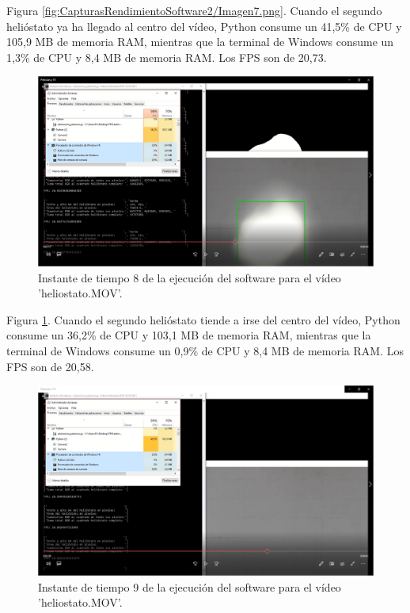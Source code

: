 Figura \ref{fig:CapturasRendimientoSoftware2/Imagen7.png}. Cuando el segundo helióstato ya ha llegado al centro del vídeo, Python consume un 41,5\% de CPU y 105,9 MB de memoria RAM, mientras que la terminal de Windows consume un 1,3\% de CPU y 8,4 MB de memoria RAM. Los FPS son de 20,73.\\[20pt]

\begin{figure}[h!]
  	\centering
	\includegraphics[width=\textwidth]{CapturasRendimientoSoftware2/Imagen8.png}
	\caption{Instante de tiempo 8 de la ejecución del software para el vídeo 'heliostato.MOV'.
	\label{fig:CapturasRendimientoSoftware2/Imagen8.png}}
\end{figure}

Figura \ref{fig:CapturasRendimientoSoftware2/Imagen8.png}. Cuando el segundo helióstato tiende a irse del centro del vídeo, Python consume un 36,2\% de CPU y 103,1 MB de memoria RAM, mientras que la terminal de Windows consume un 0,9\% de CPU y 8,4 MB de memoria RAM. Los FPS son de 20,58.\\[20pt]

\begin{figure}[h!]
  	\centering
	\includegraphics[width=\textwidth]{CapturasRendimientoSoftware2/Imagen9.png}
	\caption{Instante de tiempo 9 de la ejecución del software para el vídeo 'heliostato.MOV'.
	\label{fig:CapturasRendimientoSoftware2/Imagen9.png}}
\end{figure}

